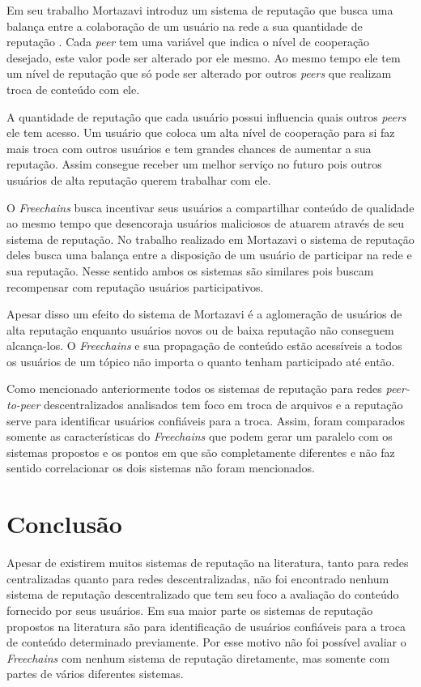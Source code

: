 \documentclass[12pt]{article}
\newcommand{\FC} {\emph{Freechains}\xspace}
\newcommand{\PtoP} {\emph{peer-to-peer}\xspace}
\begin{document}
Em seu trabalho Mortazavi introduz um sistema de reputação que busca uma balança entre a colaboração de um usuário na rede a sua quantidade de reputação \cite{mortazavi2006cumulative}. Cada \emph{peer} tem uma variável que indica o nível de cooperação desejado, este valor pode ser alterado por ele mesmo. Ao mesmo tempo ele tem um nível de reputação que só pode ser alterado por outros \emph{peers} que realizam troca de conteúdo com ele.

A quantidade de reputação que cada usuário possui influencia quais outros \emph{peers} ele tem acesso. Um usuário que coloca um alta nível de cooperação para si faz mais troca com outros usuários e tem grandes chances de aumentar a sua reputação. Assim consegue receber um melhor serviço no futuro pois outros usuários de alta reputação querem trabalhar com ele.

O \FC busca incentivar seus usuários a compartilhar conteúdo de qualidade ao mesmo tempo que desencoraja usuários maliciosos de atuarem através de seu sistema de reputação. No trabalho realizado em Mortazavi o sistema de reputação deles busca uma balança entre a disposição de um usuário de participar na rede e sua reputação. Nesse sentido ambos os sistemas são similares pois buscam recompensar com reputação usuários participativos.

Apesar disso um efeito do sistema de Mortazavi é a aglomeração de usuários de alta reputação enquanto usuários novos ou de baixa reputação não conseguem alcança-los. O \FC e sua propagação de conteúdo estão acessíveis a todos os usuários de um tópico não importa o quanto tenham participado até então.

Como mencionado anteriormente todos os sistemas de reputação para redes \PtoP descentralizados analisados tem foco em troca de arquivos e a reputação serve para identificar usuários confiáveis para a troca. Assim, foram comparados somente as características do \FC que podem gerar um paralelo com os sistemas propostos e os pontos em que são completamente diferentes e não faz sentido correlacionar os dois sistemas não foram mencionados.  

\section{Conclusão}\label{sec:conclusao}

Apesar de existirem muitos sistemas de reputação na literatura, tanto para redes centralizadas quanto para redes descentralizadas, não foi encontrado nenhum sistema de reputação descentralizado que tem seu foco a avaliação do conteúdo fornecido por seus usuários. Em sua maior parte os sistemas de reputação propostos na literatura são para identificação de usuários confiáveis para a troca de conteúdo determinado previamente. Por esse motivo não foi possível avaliar o \FC com nenhum sistema de reputação diretamente, mas somente com partes de vários diferentes sistemas.
\end{document}
